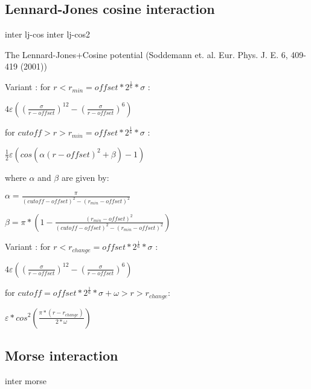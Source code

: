 \subsection{Lennard-Jones cosine interaction}
\begin{essyntax}
  inter   lj-cos
     
  inter   lj-cos2
     \var{$\omega$}
\end{essyntax}
The Lennard-Jones+Cosine potential
(Soddemann et. al. Eur. Phys. J. E. 6, 409-419 (2001))


Variant : for $r < r_{min} = offset * 2^{\frac{1}{6}} *
\sigma$ :
\begin{center}
$4\varepsilon((\frac{\sigma}{r-offset})^{12}-(\frac{\sigma}{r-offset})^6)$
\end{center}
for $cutoff > r > r_{min} = offset * 2^{\frac{1}{6}} * \sigma$ :
\begin{center}
$\frac{1}{2}\varepsilon(cos(\alpha(r-offset)^2 + \beta)-1)$
\end{center}
where $\alpha$ and $\beta$ are given by:

$\alpha = \frac{\pi}{(cutoff-offset)^2-(r_{min}-offset)^2}$

$\beta = \pi * (1 -
\frac{(r_{min}-offset)^2}{(cutoff-offset)^2-(r_{min}-offset)^2})$

Variant :
for $r < r_{change} = offset * 2^{\frac{1}{6}} * \sigma$ :
\begin{center}
$4 \varepsilon((\frac{\sigma}{r-offset})^{12}-(\frac{\sigma}{r-offset})^6)$
\end{center}
for $cutoff = offset * 2^{\frac{1}{6}} * \sigma + \omega > r > r_{change}$:
\begin{center}
$\varepsilon * cos^2(\frac{\pi * (r - r_{change})}{2 * \omega})$
\end{center}

\subsection{Morse interaction}

\begin{essyntax}
  inter   morse
     
\end{essyntax}

